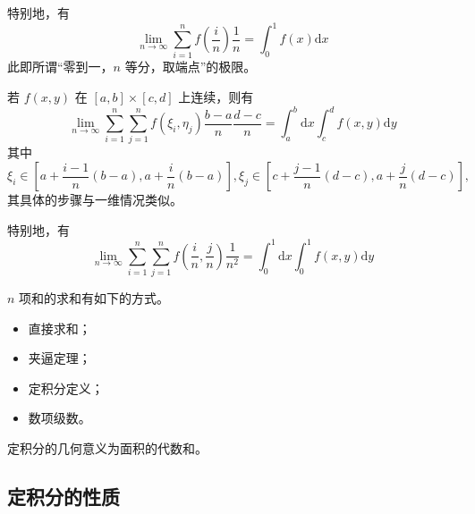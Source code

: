 特别地，有
$$
    {\displaystyle\lim_{n\rightarrow \infty}}\sum_{i=1}^n f(\dfrac{i}{n})\dfrac 1n =\int_0^1f(x)\mathrm{d}x
$$ 
此即所谓“零到一，$n $ 等分，取端点”的极限。


若 $ f(x,y) $ 在 $ [a,b]\times [c,d] $ 上连续，则有$$
    {\displaystyle\lim_{n\rightarrow \infty}}\sum_{i=1}^n\sum_{j=1}^n f(\xi_i,\eta_j)\dfrac{b-a}{n}
    \dfrac{d-c}{n} = \int_a^b\mathrm{d}x\int_c^df(x,y)\mathrm{d}y
$$ 
其中$$
    \xi_i\in [a+\dfrac{i-1}{n}(b-a),a+\dfrac{i}{n}(b-a)],
    \xi_j\in [c+\dfrac{j-1}{n}(d-c),a+\dfrac{j}{n}(d-c)],
$$ 
其具体的步骤与一维情况类似。

特别地，有
$$
    {\displaystyle\lim_{n\rightarrow \infty}}\sum_{i=1}^n\sum_{j=1}^n f(\dfrac{i}{n},\dfrac{j}{n})
    \dfrac{1}{n^2} = \int_0^1\mathrm{d}x\int_0^1f(x,y)\mathrm{d}y
$$ 



$ n $ 项和的求和有如下的方式。
\begin{itemize}
    \item 直接求和；
    \item 夹逼定理；
    \item 定积分定义；
    \item 数项级数。
\end{itemize}

\begin{Field}[定积分的几何意义]

    定积分的几何意义为面积的代数和。
\end{Field}

\subsection{定积分的性质}

